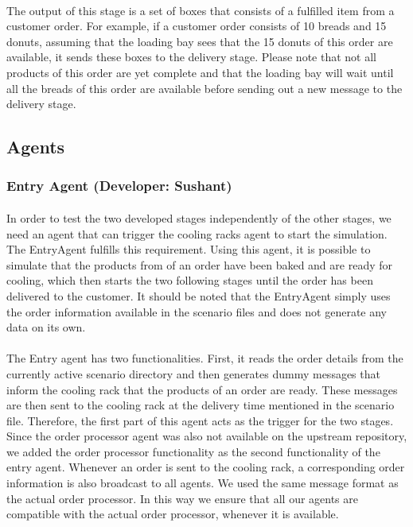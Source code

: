 \documentclass[11pt, a4paper]{article}
\begin{document}
\paragraph{}
The output of this stage is a set of boxes that consists of a fulfilled item from a customer order. For example, if a customer order consists of 10 breads and 15 donuts, assuming that the loading bay sees that the 15 donuts of this order are available, it sends these boxes to the delivery stage. Please note that not all products of this order are yet complete and that the loading bay will wait until all the breads of this order are available before sending out a new message to the delivery stage.

\hfill\break
\subsection{Agents}\label{PackagingAgents}
\subsubsection{Entry Agent (Developer: Sushant)}
\paragraph{}
In order to test the two developed stages independently of the other stages, we need an agent that can trigger the cooling racks agent to start the simulation. The EntryAgent fulfills this requirement. Using this agent, it is possible to simulate that the products from of an order have been baked and are ready for cooling, which then starts the two following stages until the order has been delivered to the customer. It should be noted that the EntryAgent simply uses the order information available in the scenario files and does not generate any data on its own.

\paragraph{}
The Entry agent has two functionalities. First, it reads the order details from the currently active scenario directory and then generates dummy messages that inform the cooling rack that the products of an order are ready. These messages are then sent to the cooling rack at the delivery time mentioned in the scenario file. Therefore, the first part of this agent acts as the trigger for the two stages. Since the order processor agent was also not available on the upstream repository, we added the order processor functionality as the second functionality of the entry agent. Whenever an order is sent to the cooling rack, a corresponding order information is also broadcast to all agents. We used the same  message format as the actual order processor. In this way we ensure that all our agents are compatible with the actual order processor, whenever it is available.
\end{document}
